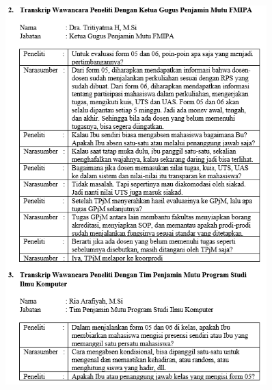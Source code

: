 \begin{figure}[H]
	\centering
	\includegraphics[width=0.9\textwidth]{gambar/lampiran/UR-2}	
\end{figure}
